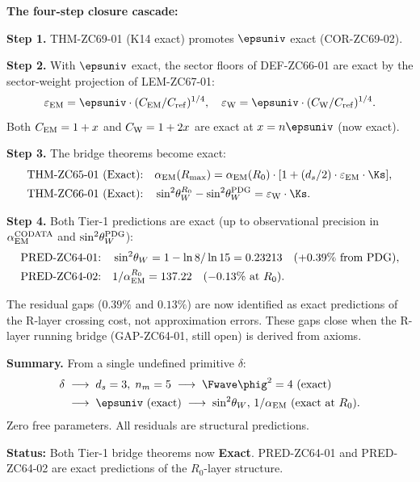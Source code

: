 \documentclass[12pt, a4paper]{article}
\renewcommand{\swsq}{\sin^2\!\theta_W}
\renewcommand{\aEM}{\alpha_{\rm EM}}
\begin{document}
\begin{formalbox}[title={COR-ZC69-04: Tier-1 Bridge Closure Cascade
  ($R_0 \to R_{\max}$, Exact)}]

\textbf{The four-step closure cascade:}

\medskip
\textbf{Step 1.} THM-ZC69-01 (K14 exact) promotes $\epsuniv$ exact
(COR-ZC69-02).

\medskip
\textbf{Step 2.} With $\epsuniv$ exact, the sector floors
of DEF-ZC66-01 are exact by the sector-weight projection
of LEM-ZC67-01:
\[
  \varepsilon_{\rm EM} = \epsuniv\cdot(C_{\rm EM}/C_{\rm ref})^{1/4},
  \quad
  \varepsilon_{\rm W}  = \epsuniv\cdot(C_{\rm W}/C_{\rm ref})^{1/4}.
\]
Both $C_{\rm EM} = 1+x$ and $C_{\rm W} = 1+2x$
are exact at $x = n\epsuniv$ (now exact).

\medskip
\textbf{Step 3.} The bridge theorems become exact:
\begin{align*}
  \text{THM-ZC65-01 (Exact):}\quad&
  \aEM(R_{\max}) = \aEM(R_0)\cdot[1 + (d_s/2)\cdot\varepsilon_{\rm EM}\cdot\Ks],\\
  \text{THM-ZC66-01 (Exact):}\quad&
  \swsq^{R_0} - \swsq^{\rm PDG} = \varepsilon_{\rm W}\cdot\Ks.
\end{align*}

\medskip
\textbf{Step 4.} Both Tier-1 predictions are exact
(up to observational precision in $\aEM^{\rm CODATA}$
and $\swsq^{\rm PDG}$):
\begin{align*}
  \text{PRED-ZC64-01:}\quad&
  \swsq = 1 - \ln8/\ln15 = 0.23213 \quad(+0.39\%\ \text{from PDG}),\\
  \text{PRED-ZC64-02:}\quad&
  1/\aEM^{R_0} = 137.22 \quad(-0.13\%\ \text{at }R_0).
\end{align*}

The residual gaps ($0.39\%$ and $0.13\%$) are now
identified as exact predictions of the R-layer crossing
cost, not approximation errors.
These gaps close when the R-layer running bridge
(GAP-ZC64-01, still open) is derived from axioms.

\textbf{Summary.}
From a single undefined primitive $\delta$:
\begin{align*}
  \delta
  &\;\longrightarrow\;
  d_s = 3,\; n_m = 5
  \;\longrightarrow\;
  \Fwave\phig^2 = 4\ (\text{exact})\\
  &\;\longrightarrow\;
  \epsuniv\ (\text{exact})
  \;\longrightarrow\;
  \swsq,\, 1/\aEM\ (\text{exact at }R_0).
\end{align*}
Zero free parameters. All residuals are structural predictions.

\textbf{Status:} Both Tier-1 bridge theorems now \textbf{Exact}.
PRED-ZC64-01 and PRED-ZC64-02 are exact predictions
of the $R_0$-layer structure.
\end{formalbox}
\end{document}
